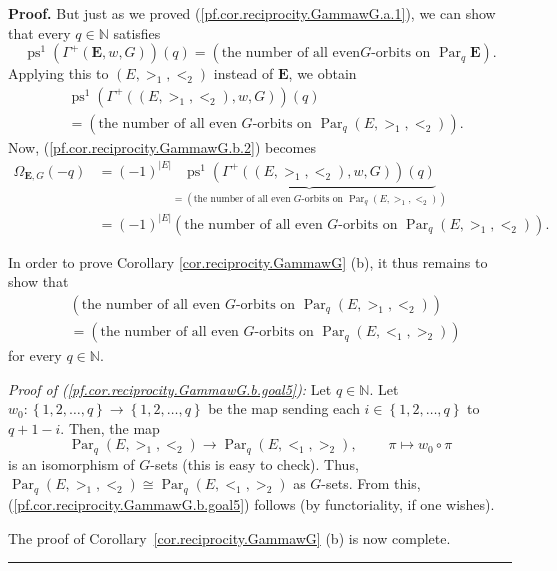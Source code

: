 \documentclass[numbers=enddot,12pt,final,onecolumn,notitlepage,abstracton]{scrartcl}
\theoremstyle{definition}
\newenvironment{proof}[1][Proof]{\noindent\textbf{#1.} }{\ \rule{0.5em}{0.5em}}
\newcommand{\Par}{\operatorname{Par}}
\newcommand{\EE}{{\mathbf{E}}}
\newcommand{\NN}{{\mathbb{N}}}
\begin{document}
\begin{proof}
But just as we proved (\ref{pf.cor.reciprocity.GammawG.a.1}), we can show that
every $q\in \NN $ satisfies
\[
\operatorname{ps}^{1}\left(  \Gamma^{+}\left( \EE ,
w,G\right)  \right)  \left(  q\right)  =\left(  \text{the number of all even
}G\text{-orbits on } \Par_q \EE \right)  .
\]
Applying this to $\left(  E,>_{1},<_{2}\right)  $ instead of $\mathbf{E}$, we
obtain%
\begin{align*}
&  \operatorname{ps}^{1}\left(  \Gamma^{+}\left(  \left(
E,>_{1},<_{2}\right)  ,w,G\right)  \right)  \left(  q\right) \\
&  =\left(  \text{the number of all even }G\text{-orbits on }%
\Par_q \left(  E,>_{1},<_{2}\right)  \right)  .
\end{align*}
Now, (\ref{pf.cor.reciprocity.GammawG.b.2}) becomes%
\begin{align*}
\Omega_{\EE, G}\left(  -q\right)   &  =\left(  -1\right)  ^{\left\vert
E\right\vert }\underbrace{\operatorname{ps}^{1}\left(  \Gamma
^{+}\left(  \left(  E,>_{1},<_{2}\right)  ,w,G\right)  \right)  \left(
q\right)  }_{=\left(  \text{the number of all even }G\text{-orbits on }
\Par_q \left(  E,>_{1},<_{2}\right)  \right)  }\\
&  =\left(  -1\right)  ^{\left\vert E\right\vert }\left(  \text{the number of
all even }G\text{-orbits on }
\Par_q \left( E,>_{1},<_{2}\right)  \right)  .
\end{align*}


In order to prove Corollary \ref{cor.reciprocity.GammawG} (b), it thus remains
to show that
\begin{align}
&  \left(  \text{the number of all even }G\text{-orbits on }%
\Par_{q} \left(  E,>_{1},<_{2}\right)  \right)
\nonumber\\
&  =\left(  \text{the number of all even }G\text{-orbits on }%
\Par_{q} \left(  E,<_{1},>_{2}\right)  \right)
\label{pf.cor.reciprocity.GammawG.b.goal5}
\end{align}
for every $q\in \NN $.

\textit{Proof of (\ref{pf.cor.reciprocity.GammawG.b.goal5}):} Let
$q\in \NN $. Let $w_{0}:\left\{  1,2,\ldots,q\right\}  \rightarrow
\left\{  1,2,\ldots,q\right\}  $ be the map sending each $i\in\left\{
1,2,\ldots,q\right\}  $ to $q+1-i$. Then, the map
\[
 \Par_q \left(  E,>_{1},<_{2}\right)  \rightarrow
 \Par_q \left(  E,<_{1},>_{2}\right)
,\ \ \ \ \ \ \ \ \ \ \pi\mapsto w_{0}\circ\pi
\]
is an isomorphism of $G$-sets (this is easy to check). Thus,
$\Par_q \left(  E,>_{1},<_{2}\right)  \cong
 \Par_q \left(  E,<_{1},>_{2}\right)  $ as $G$-sets.
From this, (\ref{pf.cor.reciprocity.GammawG.b.goal5}) follows (by
functoriality, if one wishes).

The proof of Corollary~\ref{cor.reciprocity.GammawG} (b) is now complete.
\end{proof}
\end{document}
